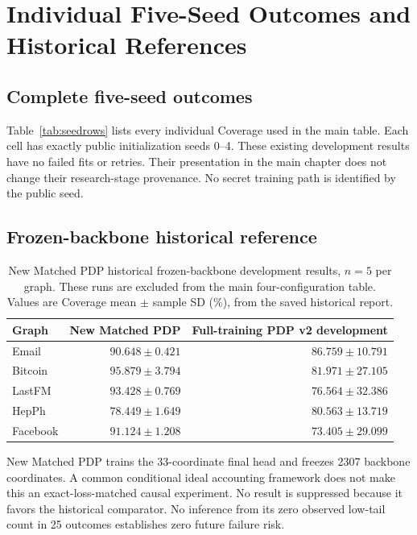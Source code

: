 \chapter{Individual Five-Seed Outcomes and Historical References}\label{app:development}
\section{Complete five-seed outcomes}
Table~\ref{tab:seedrows} lists every individual Coverage used in the main table. Each cell has exactly public initialization seeds 0--4. These existing development results have no failed fits or retries. Their presentation in the main chapter does not change their research-stage provenance. No secret training path is identified by the public seed.


\clearpage
\section{Frozen-backbone historical reference}
\begin{table}[htbp]
\centering\small
\caption{New Matched PDP historical frozen-backbone development results, $n=5$ per graph. These runs are excluded from the main four-configuration table. Values are Coverage mean $\pm$ sample SD (\%), from the saved historical report.}\label{tab:newmatched}
\begin{tabular}{lrr}\toprule
Graph & New Matched PDP & Full-training PDP v2 development\\\midrule
Email & $90.648\pm0.421$ & $86.759\pm10.791$\\
Bitcoin & $95.879\pm3.794$ & $81.971\pm27.105$\\
LastFM & $93.428\pm0.769$ & $76.564\pm32.386$\\
HepPh & $78.449\pm1.649$ & $80.563\pm13.719$\\
Facebook & $91.124\pm1.208$ & $73.405\pm29.099$\\\bottomrule
\end{tabular}
\end{table}

New Matched PDP trains the 33-coordinate final head and freezes 2307 backbone coordinates. A common conditional ideal accounting framework does not make this an exact-loss-matched causal experiment. No result is suppressed because it favors the historical comparator. No inference from its zero observed low-tail count in 25 outcomes establishes zero future failure risk.

